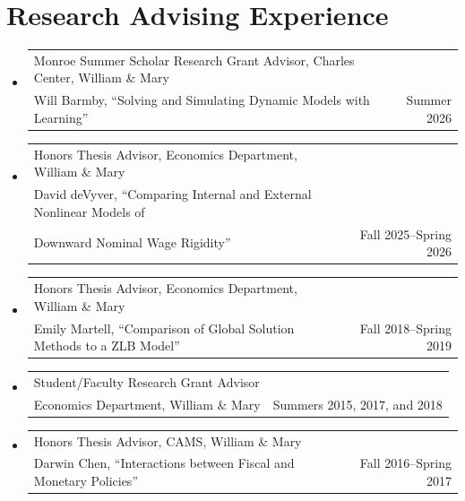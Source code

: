 \documentclass[10pt,letterpaper,en-US]{article}
\makeatletter
\newcommand{\itemrow}[2]
{\begin{tabular*}{\linewidth}{l@{\extracolsep{\fill}}r}
	#1 & #2 \\
\end{tabular*}}
\makeatother
\begin{document}
\section*{Research Advising Experience}
\begin{itemize}
    \item \itemrow{Monroe Summer Scholar Research Grant Advisor, Charles Center, William \& Mary  \\
    Will Barmby, ``Solving and Simulating Dynamic Models with Learning''}{Summer 2026}
    \item \itemrow{Honors Thesis Advisor, Economics Department, William \& Mary  \\
    David deVyver, ``Comparing Internal and External Nonlinear Models of \\
    Downward Nominal Wage Rigidity''}{Fall 2025--Spring 2026}
    \item \itemrow{Honors Thesis Advisor, Economics Department, William \& Mary  \\
    Emily Martell, ``Comparison of Global Solution Methods to a ZLB Model''}{Fall 2018--Spring 2019}
    \item \itemrow{Student/Faculty Research Grant Advisor \\
     Economics Department, William \& Mary}{Summers 2015, 2017, and 2018}
    \item \itemrow{Honors Thesis Advisor, CAMS, William \& Mary  \\
    Darwin Chen, ``Interactions between Fiscal and Monetary Policies''}{Fall 2016--Spring 2017}
\end{itemize}
\end{document}
